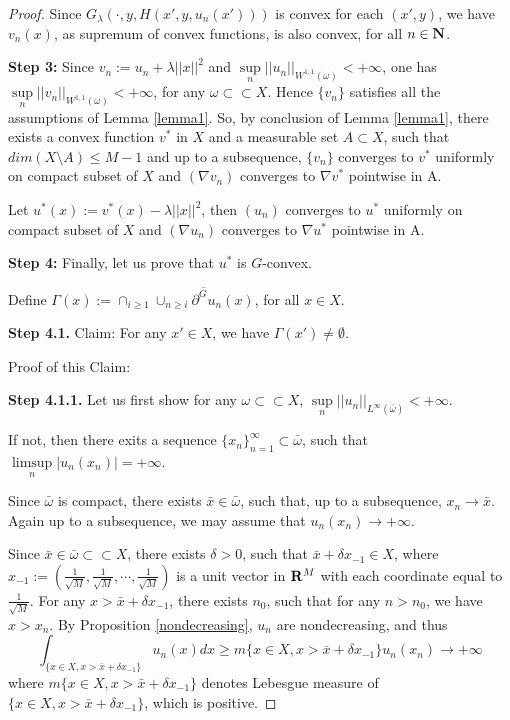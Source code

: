 \begin{proof}
	
	Since $G_{\lambda}(\cdot,y,H(x',y,u_n(x')))$ is convex for each $(x', y)$, we have $v_n(x)$, as supremum of convex functions, is also convex, for all $n \in \mathbf{N}$.\medskip
	
	
	
	{\bf Step 3:}	Since $v_n:= u_n +\lambda||x||^2$ and $\sup\limits_{n}||u_n||_{W^{1,1}(\omega)} < +\infty$, one has $\sup\limits_{n}||v_n||_{W^{1,1}(\omega)} < +\infty$, for any $\omega \subset \subset X$. Hence $\{v_n\}$ satisfies all the assumptions of Lemma \ref{lemma1}. So, by conclusion of Lemma \ref{lemma1}, there exists a convex function $v^*$ in $X$ and a measurable set $A \subset X$, such that $dim (X \setminus A)\le M-1$ and up to a subsequence, $\{v_n\}$ converges to $v^*$ uniformly on compact subset of $X$ and $(\nabla v_n)$ converges to $\nabla v^*$ pointwise in A.
	
	Let $u^*(x):=v^*(x)-\lambda||x||^2$, then  $(u_n)$ converges to $u^*$ uniformly on compact subset of $X$ and $(\nabla u_n)$ converges to $\nabla u^*$ pointwise in A.\medskip
	
	{\bf Step 4:}	Finally, let us prove that $u^*$ is $G$-convex.\medskip
	
	Define $\Gamma(x):=\cap_{i\ge 1}\overline{\cup_{n\ge i}\partial^G u_n(x)}$, for all $x\in X$.\medskip

	
	{\bf	Step 4.1.} Claim: For any $x'\in X$, we have $\Gamma(x') \neq \emptyset$.
	
	Proof of this Claim: 
	
	{\bf Step 4.1.1.} Let us first show for any $\omega \subset\subset X$, $\sup\limits_{n}||u_n||_{L^{\infty}(\bar{\omega})}<+\infty$.
	
	If not, then there exits a sequence $\{x_n\}_{n=1}^{\infty}\subset \bar{\omega}$, such that $\limsup\limits_{n}|u_n(x_n)|=+\infty$.
	
	Since $\bar{\omega}$ is compact, there exists $\bar{x}\in \bar{\omega}$, such that, up to a subsequence, $x_n\rightarrow \bar{x}$. Again up to a subsequence, we may assume that $u_n(x_n)\rightarrow +\infty$.
	
	Since $\bar{x} \in \bar{\omega} \subset \subset X$, there exists $\delta >0$, such that $\bar{x}+\delta x_{-1} \in X$, where $x_{-1}:=(\frac{1}{\sqrt{M}}, \frac{1}{\sqrt{M}}, \cdots, \frac{1}{\sqrt{M}})$ is a unit vector in ${\mathbf R}^M$ with each coordinate equal to $\frac{1}{\sqrt{M}}$. For any $x>\bar{x} + \delta x_{-1}$, there exists $n_0$, such that for any $n>n_0$, we have $x>x_n$. By Proposition \ref{nondecreasing}, $u_n$ are nondecreasing, and thus
	\begin{equation}\label{eqn_integral}
	\int_{\{x\in X, x>\bar{x} +\delta x_{-1}\}} u_n(x)dx \ge m\{x\in X, x> \bar{x}+\delta x_{-1}\} u_n(x_n)\rightarrow +\infty
	\end{equation}
	where $m\{x\in X, x>\bar{x}+\delta x_{-1}\}$ denotes Lebesgue measure of $\{x\in X, x>\bar{x}+\delta x_{-1}\}$, which is positive.
	

\end{proof}
